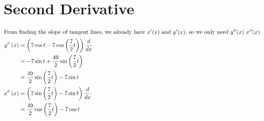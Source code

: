 \documentclass[12pt]{article}
\begin{document}
\section{Second Derivative}
\begin{align}
  \intertext{From finding the slope of tangent lines, we already have $x'(x)$ and $y'(x)$, so we only need $y''(x)$ $x''(x)$ }
  y''\left(x\right) & =\left(7\cos t-7\cos\left(\frac{7}{2}t\right)\right)\frac{d}{dx} \\
                    & =-7\sin t+\frac{49}{2}\sin\left(\frac{7}{2}t\right)              \\
                    & =\frac{49}{2}\sin\left(\frac{7}{2}t\right)-7\sin t               \\
  x''\left(x\right) & =\left(7\sin\left(\frac{7}{2}t\right)-7\sin t\right)\frac{d}{dx} \\
                    & =\frac{49}{2}\cos\left(\frac{7}{2}t\right)-7\cos t
\end{align}
\end{document}
